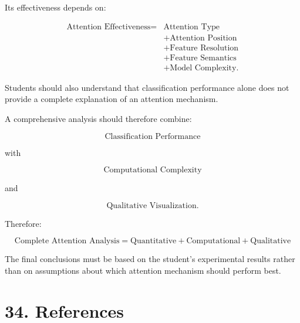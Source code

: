 \documentclass[10pt]{article}
\begin{document}
Its effectiveness depends on:

\[
\boxed{
\begin{aligned}
\text{Attention Effectiveness}
={}&
\text{Attention Type}\\
&+
\text{Attention Position}\\
&+
\text{Feature Resolution}\\
&+
\text{Feature Semantics}\\
&+
\text{Model Complexity}.
\end{aligned}
}
\]

Students should also understand that classification performance alone does
not provide a complete explanation of an attention mechanism.

A comprehensive analysis should therefore combine:

\[
\boxed{
\text{Classification Performance}
}
\]

with

\[
\boxed{
\text{Computational Complexity}
}
\]

and

\[
\boxed{
\text{Qualitative Visualization}.
}
\]

Therefore:

\[
\boxed{
\text{Complete Attention Analysis}
=
\text{Quantitative}
+
\text{Computational}
+
\text{Qualitative}
}
\]

The final conclusions must be based on the student's experimental results
rather than on assumptions about which attention mechanism should perform
best.

\section*{34. References}
\end{document}
